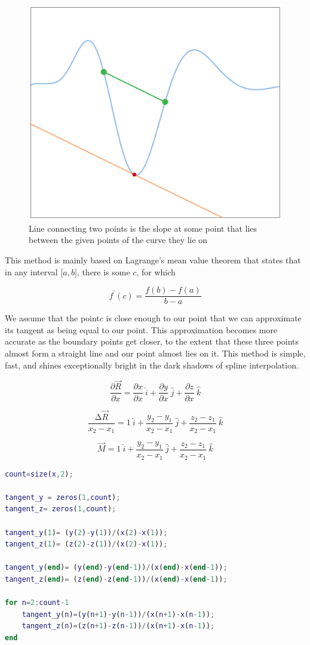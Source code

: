 \documentclass[a4paper]{article}
\begin{document}
\begin{figure}[h]
    \centering
    \includegraphics[width=0.5\linewidth]{Images/Mean Value Tangent.png}
    \caption{Line connecting two points is the slope at some point that lies between the given points of the curve they lie on}
\end{figure}
This method is mainly based on Lagrange's mean value theorem that states that in any interval \(\lbrack a,b\rbrack\), there is some \(c\), for which

\[f^{'}(c) = \frac{f(b) - f(a)}{b - a}\]

We assume that the point\(c\) is close enough to our point that we can approximate its tangent as being equal to our point. This approximation becomes more accurate as the boundary points get closer, to the extent that these three points almost form a straight line and our point almost lies on it.
This method is simple, fast, and shines exceptionally bright in the dark shadows of spline interpolation.

\[\frac{\partial\vec{R}}{\partial x} = \frac{\partial x}{\partial x}\ \hat{i} + \frac{\partial y}{\partial x}\ \hat{j} + \frac{\partial z}{\partial x}\ \hat{k}\]

\[\frac{\mathrm{\Delta}\vec{R}}{x_{2} - x_{1}} = 1\ \hat{i} + \frac{y_{2} - y_{1}}{x_{2} - x_{1}}\ \hat{j} + \frac{z_{2} - z_{1}}{x_{2} - x_{1}}\ \hat{k}\]

\[\vec{M} = 1\ \hat{i} + \frac{y_{2} - y_{1}}{x_{2} - x_{1}}\ \hat{j} + \frac{z_{2} - z_{1}}{x_{2} - x_{1}}\ \hat{k}\]

\begin{lstlisting}[language=matlab]
count=size(x,2);

tangent_y = zeros(1,count);
tangent_z= zeros(1,count);

tangent_y(1)= (y(2)-y(1))/(x(2)-x(1));
tangent_z(1)= (z(2)-z(1))/(x(2)-x(1));

tangent_y(end)= (y(end)-y(end-1))/(x(end)-x(end-1));
tangent_z(end)= (z(end)-z(end-1))/(x(end)-x(end-1));

for n=2:count-1
    tangent_y(n)=(y(n+1)-y(n-1))/(x(n+1)-x(n-1));
    tangent_z(n)=(z(n+1)-z(n-1))/(x(n+1)-x(n-1));
end

\end{lstlisting}
\end{document}
